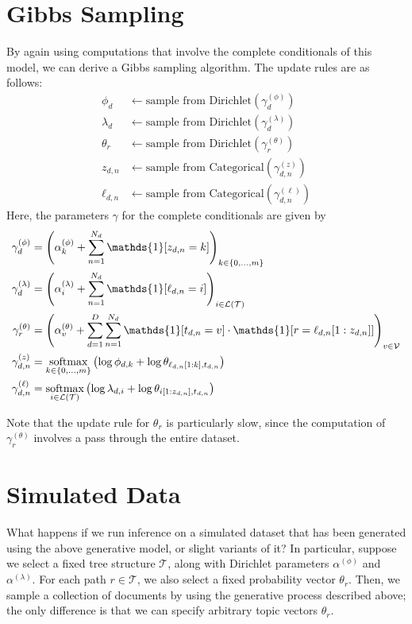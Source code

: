 \documentclass{article}
\newcommand{\indicator}{\mathds{1}}
\begin{document}
\section{Gibbs Sampling}

By again using computations that involve the complete conditionals of this model, we can derive a Gibbs sampling algorithm.
The update rules are as follows:
\begin{align}
\phi_d &\gets \text{sample from Dirichlet}(\gamma^{(\phi)}_d) \\
\lambda_d &\gets \text{sample from Dirichlet}(\gamma^{(\lambda)}_d) \\
\theta_r &\gets \text{sample from Dirichlet}(\gamma^{(\theta)}_r) \\
z_{d,n} &\gets \text{sample from Categorical}(\gamma^{(z)}_{d,n}) \\
\ell_{d,n} &\gets \text{sample from Categorical}(\gamma^{(\ell)}_{d,n})
\end{align}
%
Here, the parameters $\gamma$ for the complete conditionals are given by
\begin{align}
\gamma^{(\phi)}_d
&= \left( \alpha^{(\phi)}_k + \sum_\nWordSlot \indicator[z_{d,n} = k] \right)_\kDepthSet \\
%
\gamma^{(\lambda)}_d
&= \left( \alpha^{(\lambda)}_i + \sum_\nWordSlot \indicator[\ell_{d,n} = i] \right)_\iLeaf \\
%
\gamma^{(\theta)}_r
&= \left( \alpha^{(\theta)}_v + \sum_\dDoc \sum_\nWordSlot \indicator[t_{d,n} = v] \cdot \indicator[r = \ell_{d,n}[1:z_{d,n}]] \right)_\vVocab \\
%
\gamma^{(z)}_{d,n}
&= \softmax_\kDepthSet \left( \log \phi_{d,k} + \log \theta_{\ell_{d,n}[1:k], t_{d,n}} \right) \\
%
\gamma^{(\ell)}_{d,n}
&= \softmax_\iLeaf \left( \log \lambda_{d,i} + \log \theta_{i[1:z_{d,n}], t_{d,n}} \right)
\end{align}

Note that the update rule for $\theta_r$ is particularly slow, since the computation of $\gamma^{(\theta)}_r$ involves a pass through the entire dataset.


\section{Simulated Data}

What happens if we run inference on a simulated dataset that has been generated using the above generative model, or slight variants of it?
In particular, suppose we select a fixed tree structure $\mathcal T$, along with Dirichlet parameters $\alpha^{(\phi)}$ and $\alpha^{(\lambda)}$.
For each path $r \in \mathcal T$, we also select a fixed probability vector $\theta_r$.
Then, we sample a collection of documents by using the generative process described above; the only difference is that we can specify arbitrary topic vectors $\theta_r$.
\end{document}
